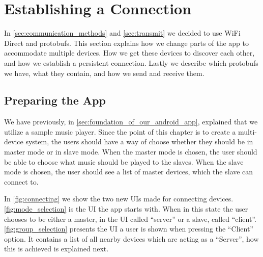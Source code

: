 \section{Establishing a Connection}\label{sec:establishing_a_connection}
In \cref{sec:communication_methods} and \cref{sec:transmit} we decided to use WiFi Direct and protobufs.
This section explains how we change parts of the app to accommodate multiple devices.
How we get these devices to discover each other, and how we establish a persistent connection.
Lastly we describe which protobufs we have, what they contain, and how we send and receive them.

\subsection{Preparing the App}
We have previously, in \cref{sec:foundation_of_our_android_app}, explained that we utilize a sample music player.
Since the point of this chapter is to create a multi-device system, the users should have a way of choose whether they should be in master mode or in slave mode.
When the master mode is chosen, the user should be able to choose what music should be played to the slaves.
When the slave mode is chosen, the user should see a list of master devices, which the slave can connect to.

In \cref{fig:connecting} we show the two new UIs made for connecting devices.
\cref{fig:mode_selection} is the UI the app starts with.
When in this state the user chooses to be either a master, in the UI called ``server'' or a slave, called ``client''.
\cref{fig:group_selection} presents the UI a user is shown when pressing the ``Client'' option.
It contains a list of all nearby devices which are acting as a ``Server'', how this is achieved is explained next.

